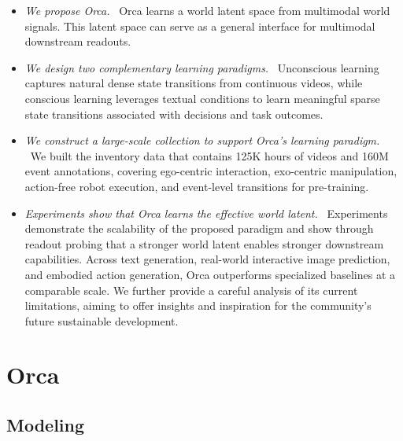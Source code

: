 \documentclass{llmxive}
\providecommand{\currentnavsection}{sec:intro}
\providecommand{\setnavsection}[1]{  \gdef\currentnavsection{#1}}
\begin{document}
\vspace{-0.5em}
\begin{itemize}
    \item \textit{We propose Orca.} \ Orca learns a world latent space from multimodal world signals. This latent space can serve as a general interface for multimodal downstream readouts.

    \item \textit{We design two complementary learning paradigms.} \ Unconscious learning captures natural dense state transitions from continuous videos, while conscious learning leverages textual conditions to learn meaningful sparse state transitions associated with decisions and task outcomes.
    
    \item \textit{We construct a large-scale collection to support Orca's learning paradigm.} \ We built the inventory data that contains 125K hours of videos and 160M event annotations, covering ego-centric interaction, exo-centric manipulation, action-free robot execution, and event-level transitions for pre-training.
    
    \item \textit{Experiments show that Orca learns the effective world latent.} \ Experiments demonstrate the scalability of the proposed paradigm and show through readout probing that a stronger world latent enables stronger downstream capabilities. Across text generation, real-world interactive image prediction, and embodied action generation, Orca outperforms specialized baselines at a comparable scale. We further provide a careful analysis of its current limitations, aiming to offer insights and inspiration for the community's future sustainable development.
\end{itemize}


\section{Orca}\label{sec:method}
\setnavsection{sec:method}


\subsection{Modeling}
\label{sec:method_modeling}
\end{document}
